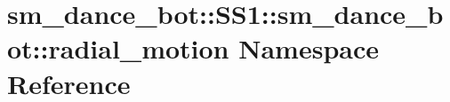 \hypertarget{namespacesm__dance__bot_1_1SS1_1_1sm__dance__bot_1_1radial__motion}{}\section{sm\+\_\+dance\+\_\+bot\+:\+:S\+S1\+:\+:sm\+\_\+dance\+\_\+bot\+:\+:radial\+\_\+motion Namespace Reference}
\label{namespacesm__dance__bot_1_1SS1_1_1sm__dance__bot_1_1radial__motion}
